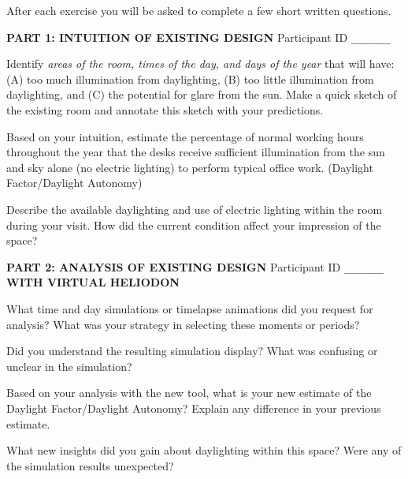 \documentclass[12pt]{article}
\begin{document}
After each exercise you will be asked to complete a few short written
questions.


\newpage 
{\bf PART 1: INTUITION OF EXISTING DESIGN }
\hfill Participant ID \verb+_______+
\vspace{0.2in}

Identify {\em areas of the room, times of the day, and days of the
  year} that will have: (A) too much illumination from daylighting,
(B) too little illumination from daylighting, and (C) the potential
for glare from the sun.  Make a quick sketch of the existing room and
annotate this sketch with your predictions.

\vspace{4.8in}


Based on your intuition, estimate the percentage of normal working
hours throughout the year that the desks receive sufficient
illumination from the sun and sky alone (no electric lighting) to
perform typical office work.  (Daylight Factor/Daylight Autonomy)


\vspace{0.9in}


Describe the available daylighting and use of electric lighting within
the room during your visit.  How did the current condition affect your
impression of the space?

\vspace{0.6in}


\newpage
{\bf PART 2: ANALYSIS OF EXISTING DESIGN }
\hfill Participant ID \verb+_______+\\
{\bf WITH VIRTUAL HELIODON }
\vspace{0.2in}

What time and day simulations or timelapse animations did you request
for analysis?  What was your strategy in selecting these moments or periods?
\vspace{1.7in}


Did you understand the resulting simulation display?  What was
confusing or unclear in the simulation?
\vspace{1.65in}


Based on your analysis with the new tool, what is your new estimate of
the Daylight Factor/Daylight Autonomy?  Explain any difference in your
previous estimate.
\vspace{1.65in}



What new insights did you gain about daylighting within this space?
Were any of the simulation results unexpected?  
\vspace{1.7in}
\end{document}
